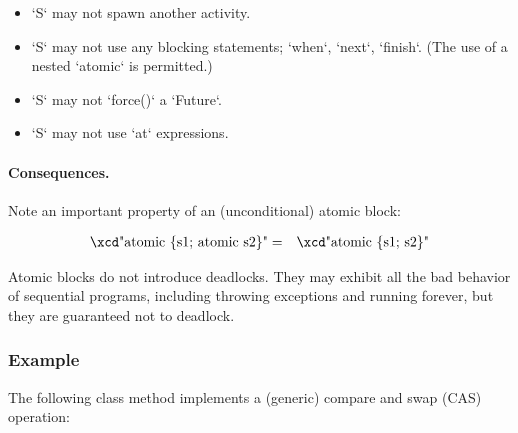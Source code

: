\begin{itemize}
\item \xcd`S` may not spawn another activity.
\item \xcd`S` may not use any blocking statements; \xcd`when`, \xcd`next`,
      \xcd`finish`.  (The use of a nested \xcd`atomic` is permitted.)
\item \xcd`S` may not \xcd`force()` a \xcd`Future`. 
\item \xcd`S` may not use \xcd`at` expressions.
\end{itemize}



\paragraph{Consequences.}
Note an important property of an (unconditional) atomic block:

\begin{eqnarray}
 \mbox{\xcd"atomic \{s1; atomic s2\}"} &=& \mbox{\xcd"atomic \{s1; s2\}"}
\end{eqnarray}

Atomic blocks do not introduce deadlocks.    They may exhibit all the bad
behavior of sequential programs, including throwing exceptions and running
forever, but they are guaranteed not to deadlock.


\subsubsection{Example}

The following class method implements a (generic) compare and swap (CAS) operation:



